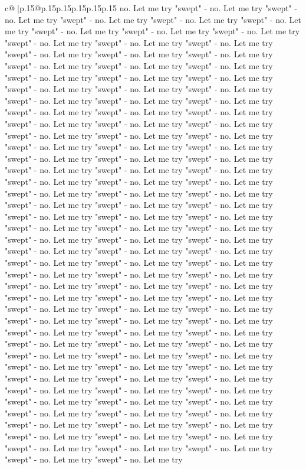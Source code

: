\documentclass{article}
\begin{document}
{\begin{supertabular}{c@{$\;$}|p{.15\linewidth}@{}p{.15\linewidth}p{.15\linewidth}p{.15\linewidth}p{.15\linewidth}p{.15\linewidth}}
{{{no. Let me try "swept" {-} no. Let me try "swept" {-} no. Let me try "swept" {-} no. Let me try "swept" {-} no. Let me try "swept" {-} no. Let me try "swept" {-} no. Let me try "swept" {-} no. Let me try "swept" {-} no. Let me try "swept" {-} no. Let me try "swept" {-} no. Let me try "swept" {-} no. Let me try "swept" {-} no. Let me try "swept" {-} no. Let me try "swept" {-} no. Let me try "swept" {-} no. Let me try "swept" {-} no. Let me try "swept" {-} no. Let me try "swept" {-} no. Let me try "swept" {-} no. Let me try "swept" {-} no. Let me try "swept" {-} no. Let me try "swept" {-} no. Let me try "swept" {-} no. Let me try "swept" {-} no. Let me try "swept" {-} no. Let me try "swept" {-} no. Let me try "swept" {-} no. Let me try "swept" {-} no. Let me try "swept" {-} no. Let me try "swept" {-} no. Let me try "swept" {-} no. Let me try "swept" {-} no. Let me try "swept" {-} no. Let me try "swept" {-} no. Let me try "swept" {-} no. Let me try "swept" {-} no. Let me try "swept" {-} no. Let me try "swept" {-} no. Let me try "swept" {-} no. Let me try "swept" {-} no. Let me try "swept" {-} no. Let me try "swept" {-} no. Let me try "swept" {-} no. Let me try "swept" {-} no. Let me try "swept" {-} no. Let me try "swept" {-} no. Let me try "swept" {-} no. Let me try "swept" {-} no. Let me try "swept" {-} no. Let me try "swept" {-} no. Let me try "swept" {-} no. Let me try "swept" {-} no. Let me try "swept" {-} no. Let me try "swept" {-} no. Let me try "swept" {-} no. Let me try "swept" {-} no. Let me try "swept" {-} no. Let me try "swept" {-} no. Let me try "swept" {-} no. Let me try "swept" {-} no. Let me try "swept" {-} no. Let me try "swept" {-} no. Let me try "swept" {-} no. Let me try "swept" {-} no. Let me try "swept" {-} no. Let me try "swept" {-} no. Let me try "swept" {-} no. Let me try "swept" {-} no. Let me try "swept" {-} no. Let me try "swept" {-} no. Let me try "swept" {-} no. Let me try "swept" {-} no. Let me try "swept" {-} no. Let me try "swept" {-} no. Let me try "swept" {-} no. Let me try "swept" {-} no. Let me try "swept" {-} no. Let me try "swept" {-} no. Let me try "swept" {-} no. Let me try "swept" {-} no. Let me try "swept" {-} no. Let me try "swept" {-} no. Let me try "swept" {-} no. Let me try "swept" {-} no. Let me try "swept" {-} no. Let me try "swept" {-} no. Let me try "swept" {-} no. Let me try "swept" {-} no. Let me try "swept" {-} no. Let me try "swept" {-} no. Let me try "swept" {-} no. Let me try "swept" {-} no. Let me try "swept" {-} no. Let me try "swept" {-} no. Let me try "swept" {-} no. Let me try "swept" {-} no. Let me try "swept" {-} no. Let me try "swept" {-} no. Let me try "swept" {-} no. Let me try "swept" {-} no. Let me try "swept" {-} no. Let me try "swept" {-} no. Let me try "swept" {-} no. Let me try "swept" {-} no. Let me try "swept" {-} no. Let me try "swept" {-} no. Let me try "swept" {-} no. Let me try "swept" {-} no. Let me try "swept" {-} no. Let me try "swept" {-} no. Let me try "swept" {-} no. Let me try "swept" {-} no. Let me try "swept" {-} no. Let me try "swept" {-} no. Let me try "swept" {-} no. Let me try "swept" {-} no. Let me try "swept" {-} no. Let me try "swept" {-} no. Let me try }}}
\end{supertabular}}
\end{document}
